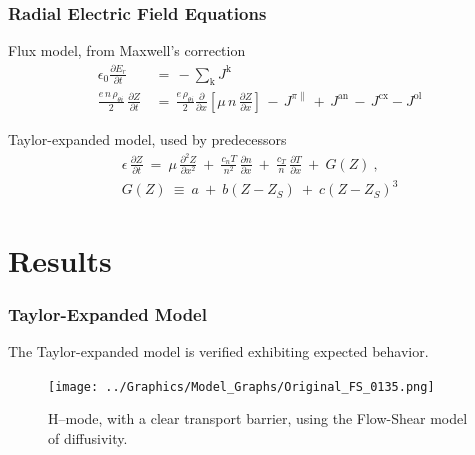 \documentclass[10pt]{beamer}
\begin{document}
\begin{frame} %
\frametitle{Radial Electric Field Equations}

Flux model, from Maxwell's correction
\begin{align} %
	\epsilon_0 \frac{\partial E_r}{\partial t} \,&=\, -\sum_\text{k} J^\text{k} \\
	\frac{e \, n \, \rho_{\theta i}}{2} \, \frac{\partial Z}{\partial t}
		\,&=\, \frac{e \, \rho_{\theta i}}{2} \frac{\partial}{\partial x}
		\left[\mu \, n \, \frac{\partial Z}{\partial x}\right] \,-\,
		J^{\pi\parallel} \,+\, J^\text{an} \,-\, J^\text{cx} - J^\text{ol}
		\label{eq:normalized_Z_equation}
\end{align}

Taylor-expanded model, used by predecessors \parencite{zohm_dynamic_1994}
\begin{align} %
	\epsilon \, \frac{\partial Z}{\partial t} ~=~ \mu \,
		\frac{\partial^2 Z}{\partial x^2} ~+~ \frac{c_n T}{n^2} \,
		\frac{\partial n}{\partial x} ~+~ \frac{c_T}{n} \,
		\frac{\partial T}{\partial x} ~+~ G(Z)~,\label{eq:original_Z_equation} \\
	G(Z) ~\equiv~ a ~+~ b(Z - Z_S) ~+~ c(Z - Z_S)^3
		\label{eq:G_polynomial}
\end{align}

\end{frame}


\section{Results}
\begin{frame} %
\frametitle{Taylor-Expanded Model}

The Taylor-expanded model is verified exhibiting expected behavior.

\begin{figure}[h]
\begin{minipage}{0.65\linewidth}
	\centering
	\texttt{[image: ../Graphics/Model\_Graphs/Original\_FS\_0135.png]}
\end{minipage}
\begin{minipage}{0.34\linewidth}
	\caption{H--mode, with a clear transport barrier, using the Flow-Shear model of diffusivity.}
\end{minipage}
\end{figure}

\end{frame}
\end{document}
